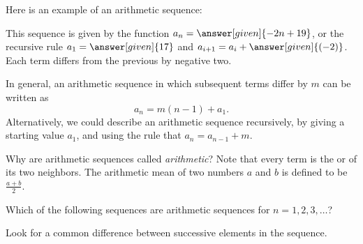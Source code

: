 \documentclass{ximera}
\begin{document}
\begin{example}
  Here is an example of an arithmetic sequence:
  \begin{image}
  \end{image}
  This sequence is given by the function $a_n=\answer[given]{-2n + 19}$, or
  the recursive rule $a_1 = \answer[given]{17}$ and $a_{i+1} = a_i +
  \answer[given]{(-2)}$. Each term differs from the previous by negative
  two.
\end{example}



In general, an arithmetic sequence in which subsequent terms differ
by $m$ can be written as
\[
a_n = m (n-1) + a_1.
\]
Alternatively, we could describe an arithmetic sequence recursively,
by giving a starting value $a_1$, and using the rule that $a_{n} =
a_{n-1} + m$.


\begin{remark}
Why are arithmetic sequences called \textit{arithmetic}?  Note that
every term is the  or  of its two
neighbors.  The arithmetic mean of two numbers $a$ and $b$ is defined
to be $\frac{a+b}{2}$.
\end{remark}



\begin{question}
  Which of the following sequences are arithmetic sequences for
  $n=1,2,3,\dots$?
  \begin{selectAll}
  \end{selectAll}
  \begin{hint}
    Look for a common difference between successive elements in the sequence. 
  \end{hint}
\end{question}
\end{document}
